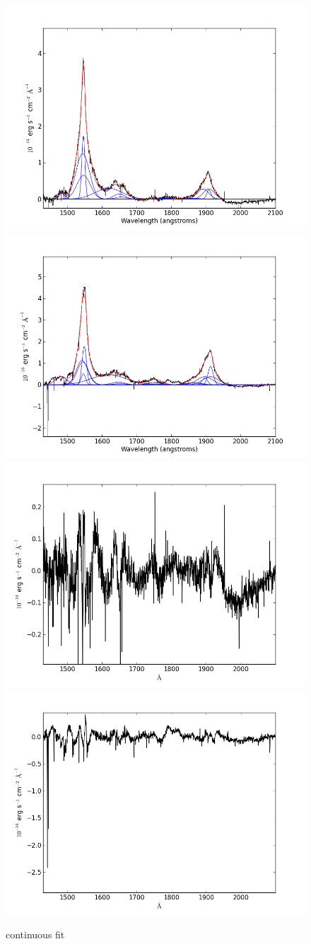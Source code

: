\documentclass[usenatbib]{mn2e}
\begin{document}
\newpage

\begin{figure}
\begin{center}
\includegraphics[width=0.46\linewidth,angle=0]{C_2.png}
\vspace{5mm}
\includegraphics[width=0.49\linewidth,angle=0]{C_3.png}\\
\includegraphics[width=0.46\linewidth,angle=0]{C_res_2.png}
\hspace{5mm}
\includegraphics[width=0.49\linewidth,angle=0]{C_res_3.png}\\
\end{center} 
\caption{continuous fit \label{fig:landscape}}   
\end{figure}
\end{document}
